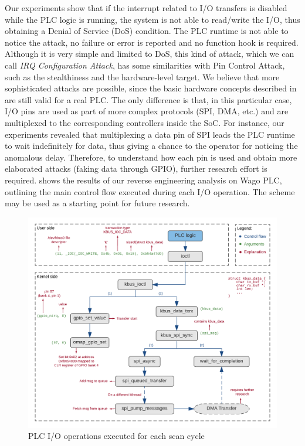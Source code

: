 Our experiments show that if the interrupt related to I/O transfers is disabled while the PLC logic is running, the system is not able to read/write the I/O,
thus obtaining a Denial of Service (DoS) condition. The PLC runtime is not able to notice the attack, no failure or error is reported and no function hook is required.
Although it is very simple and limited to DoS, this kind of attack, which we can call \emph{IRQ Configuration Attack}, has some similarities with Pin Control Attack,
such as the stealthiness and the hardware-level target.
We believe that more sophisticated attacks are possible, since the basic hardware concepts described in 
are still valid for a real PLC. The only difference is that, in this particular case, I/O pins are used as part of more complex protocols (SPI, DMA, etc.) and
are multiplexed to the corresponding controllers inside the SoC.
For instance, our experiments revealed that multiplexing a data pin of SPI leads the PLC runtime to wait indefinitely for data, thus giving a chance to the operator
for noticing the anomalous delay. Therefore, to understand how each pin is used and obtain more elaborated attacks (\eg faking data through GPIO),
further research effort is required.
 shows the results of our reverse engineering analysis on Wago PLC, outlining the main control flow executed during each I/O operation.
The scheme may be used as a starting point for future research.
\begin{figure}[h]
\centerline{\includegraphics[width=\textwidth]{res/plc_io}}
\caption{PLC I/O operations executed for each scan cycle \label{fig:plc_io}}
\end{figure}

